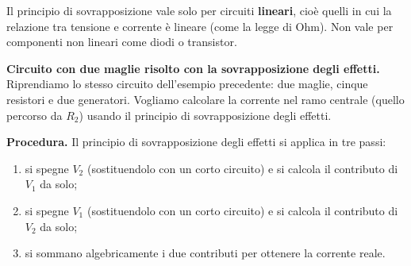 \begin{attenzione}
Il principio di sovrapposizione vale solo per circuiti \textbf{lineari}, cioè quelli in cui la relazione tra tensione e corrente è lineare (come la legge di Ohm). Non vale per componenti non lineari come diodi o transistor.
\end{attenzione}



\begin{esempio}
\textbf{Circuito con due maglie risolto con la sovrapposizione degli effetti.} 
Riprendiamo lo stesso circuito dell'esempio precedente: due maglie, cinque resistori e due generatori. Vogliamo calcolare la corrente nel ramo centrale (quello percorso da \(R_2\)) usando il principio di sovrapposizione degli effetti.

\begin{center}
\end{center}

\textbf{Procedura.} Il principio di sovrapposizione degli effetti si applica in tre passi:
\begin{enumerate}[leftmargin=1cm]
  \item si spegne \(V_2\) (sostituendolo con un corto circuito) e si calcola il contributo di \(V_1\) da solo;
  \item si spegne \(V_1\) (sostituendolo con un corto circuito) e si calcola il contributo di \(V_2\) da solo;
  \item si sommano algebricamente i due contributi per ottenere la corrente reale.
\end{enumerate}


\end{esempio}
